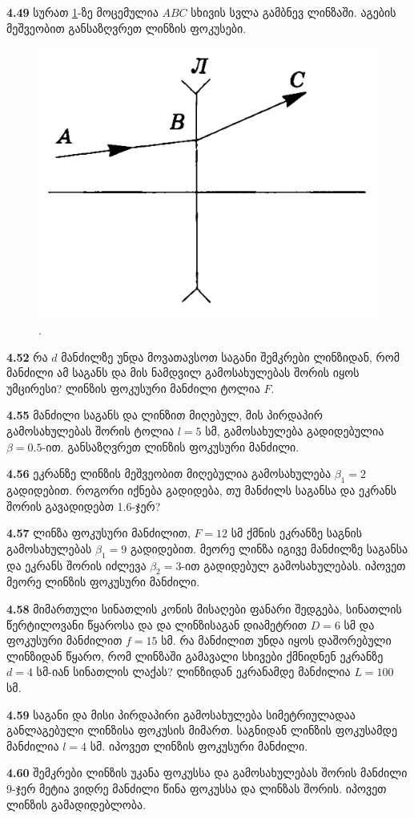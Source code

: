 \documentclass[a4paper]{book}
\begin{document}
\textbf{4.49} სურათ \ref{fig:4_49}-ზე მოცემულია $ABC$ სხივის სვლა გამბნევ ლინზაში. აგების მეშვეობით განსაზღვრეთ ლინზის ფოკუსები. 
	\begin{figure}[h]
		   \centering
           \includegraphics[width=0.4\columnwidth]{figures/4_49}
           \caption{.}
           \label{fig:4_49}
        \end{figure}

\textbf{4.52} რა $d$ მანძილზე უნდა მოვათავსოთ საგანი შემკრები ლინზიდან, რომ მანძილი ამ საგანს და მის ნამდვილ გამოსახულებას შორის იყოს უმცირესი? ლინზის ფოკუსური მანძილი ტოლია $F$.

\textbf{4.55} მანძილი საგანს და ლინზით მიღებულ, მის პირდაპირ გამოსახულებას შორის ტოლია $l = 5$ სმ, გამოსახულება გადიდებულია $\beta = 0.5$-ით. განსაზღვრეთ ლინზის ფოკუსური მანძილი.

\textbf{4.56} ეკრანზე ლინზის მეშვეობით მიღებულია გამოსახულება $\beta_1 = 2$ გადიდებით. როგორი იქნება გადიდება, თუ მანძილს საგანსა და ეკრანს შორის გავადიდებთ 1.6-ჯერ?

\textbf{4.57} ლინზა ფოკუსური მანძილით, $F = 12$ სმ ქმნის ეკრანზე საგნის გამოსახულებას $\beta_1 = 9$ გადიდებით. მეორე ლინზა იგივე მანძილზე საგანსა და ეკრანს შორის იძლევა $\beta_2 = 3$-ით გადიდებულ გამოსახულებას. იპოვეთ მეორე ლინზის ფოკუსური მანძილი.

\textbf{4.58} მიმართული სინათლის კონის მისაღები ფანარი შედგება, სინათლის წერტილოვანი წყაროსა და და ლინზისაგან დიამეტრით $D = 6$ სმ და ფოკუსური მანძილით $f = 15$  სმ. რა მანძილით უნდა იყოს დაშორებული ლინზიდან წყარო, რომ ლინზაში გამავალი სხივები ქმნიდნენ ეკრანზე $d = 4$ სმ-იან სინათლის ლაქას? ლინზიდან ეკრანამდე მანძილია $L = 100$ სმ.

\textbf{4.59} საგანი და მისი პირდაპირი გამოსახულება სიმეტრიულადაა განლაგებული ლინზისა ფოკუსის მიმართ. საგნიდან ლინზის ფოკუსამდე მანძილია $l = 4$ სმ. იპოვეთ ლინზის ფოკუსური მანძილი.

\textbf{4.60} შემკრები ლინზის უკანა ფოკუსსა და გამოსახულებას შორის მანძილი 9-ჯერ მეტია ვიდრე მანძილი წინა ფოკუსსა და ლინზას შორის. იპოვეთ ლინზის გამადიდებლობა.
       
\end{document}
